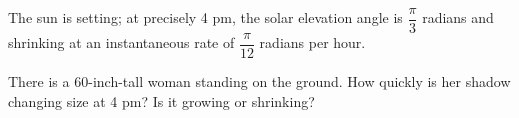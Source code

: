 \documentclass{article}
\begin{document}
\begin{enumerate}
  \makeatletter


  \makeatother

  \begin{center}
  \end{center}

  The sun is setting; at precisely 4 pm, the solar elevation angle is
  $\dfrac{\pi}{3}$ radians and shrinking at an instantaneous rate of
  $\dfrac{\pi}{12}$ radians per hour.

    \begin{problem}[\newpage]
      There is a $60$-inch-tall woman standing on the ground.  How quickly
      is her shadow changing size at 4 pm?  Is it growing or shrinking?
    \end{problem}


\end{enumerate}
\end{document}
